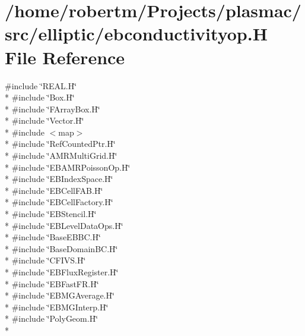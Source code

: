 \hypertarget{ebconductivityop_8H}{}\section{/home/robertm/\+Projects/plasmac/src/elliptic/ebconductivityop.H File Reference}
\label{ebconductivityop_8H}
{\ttfamily \#include \char`\"{}R\+E\+A\+L.\+H\char`\"{}}\\*
{\ttfamily \#include \char`\"{}Box.\+H\char`\"{}}\\*
{\ttfamily \#include \char`\"{}F\+Array\+Box.\+H\char`\"{}}\\*
{\ttfamily \#include \char`\"{}Vector.\+H\char`\"{}}\\*
{\ttfamily \#include $<$map$>$}\\*
{\ttfamily \#include \char`\"{}Ref\+Counted\+Ptr.\+H\char`\"{}}\\*
{\ttfamily \#include \char`\"{}A\+M\+R\+Multi\+Grid.\+H\char`\"{}}\\*
{\ttfamily \#include \char`\"{}E\+B\+A\+M\+R\+Poisson\+Op.\+H\char`\"{}}\\*
{\ttfamily \#include \char`\"{}E\+B\+Index\+Space.\+H\char`\"{}}\\*
{\ttfamily \#include \char`\"{}E\+B\+Cell\+F\+A\+B.\+H\char`\"{}}\\*
{\ttfamily \#include \char`\"{}E\+B\+Cell\+Factory.\+H\char`\"{}}\\*
{\ttfamily \#include \char`\"{}E\+B\+Stencil.\+H\char`\"{}}\\*
{\ttfamily \#include \char`\"{}E\+B\+Level\+Data\+Ops.\+H\char`\"{}}\\*
{\ttfamily \#include \char`\"{}Base\+E\+B\+B\+C.\+H\char`\"{}}\\*
{\ttfamily \#include \char`\"{}Base\+Domain\+B\+C.\+H\char`\"{}}\\*
{\ttfamily \#include \char`\"{}C\+F\+I\+V\+S.\+H\char`\"{}}\\*
{\ttfamily \#include \char`\"{}E\+B\+Flux\+Register.\+H\char`\"{}}\\*
{\ttfamily \#include \char`\"{}E\+B\+Fast\+F\+R.\+H\char`\"{}}\\*
{\ttfamily \#include \char`\"{}E\+B\+M\+G\+Average.\+H\char`\"{}}\\*
{\ttfamily \#include \char`\"{}E\+B\+M\+G\+Interp.\+H\char`\"{}}\\*
{\ttfamily \#include \char`\"{}Poly\+Geom.\+H\char`\"{}}\\*
